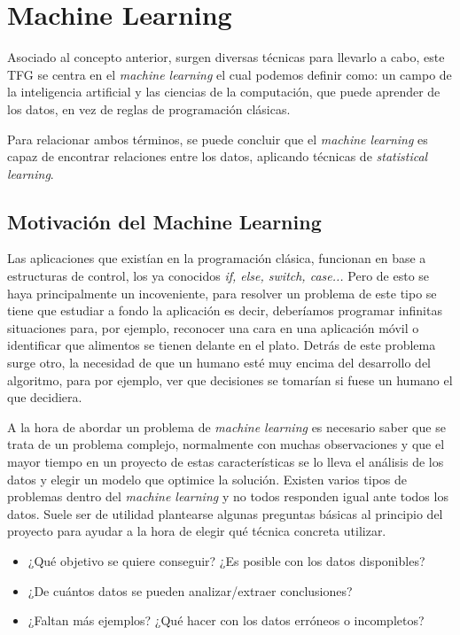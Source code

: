 \section{Machine Learning}

Asociado al concepto anterior, surgen diversas técnicas para llevarlo a cabo, este TFG se centra en el \textit{machine learning} el cual podemos definir como: un campo de la inteligencia artificial y las ciencias de la computación, que puede aprender de los datos, en vez de reglas de programación clásicas.\cite{analitics} \par 

Para relacionar ambos términos, se puede concluir que el \textit{machine learning} es capaz de encontrar relaciones entre los datos, aplicando técnicas de \textit{statistical learning}. \par 

\subsection{Motivación del Machine Learning}

Las aplicaciones que existían en la programación clásica, funcionan en base a estructuras de control, los ya conocidos \textit{if, else, switch, case...} Pero de esto se haya principalmente un incoveniente, para resolver un problema de este tipo se tiene que estudiar a fondo la aplicación es decir, deberíamos programar infinitas situaciones para, por ejemplo, reconocer una cara en una aplicación móvil o identificar que alimentos se tienen delante en el plato. Detrás de este problema surge otro, la necesidad de que un humano esté muy encima del desarrollo del algoritmo, para por ejemplo, ver que decisiones se tomarían si fuese un humano el que decidiera.\cite{ISL_python}

A la hora de abordar un problema de \textit{machine learning} es necesario saber que se trata de un problema complejo, normalmente con muchas observaciones y que el mayor tiempo en un proyecto de estas características se lo lleva el análisis de los datos y elegir un modelo que optimice la solución. Existen varios tipos de problemas dentro del \textit{machine learning} y no todos responden igual ante todos los datos. Suele ser de utilidad plantearse algunas preguntas básicas al principio del proyecto para ayudar a la hora de elegir qué técnica concreta utilizar.\cite{ISL_python}
\begin{itemize}
\item ¿Qué objetivo se quiere conseguir? ¿Es posible con los datos disponibles?
\item ¿De cuántos datos se pueden analizar/extraer conclusiones? 
\item ¿Faltan más ejemplos? ¿Qué hacer con los datos erróneos o incompletos?
\end{itemize}

